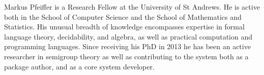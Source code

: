 \begin{participant}[type=R,PM=48,gender=male]{Markus Pfeiffer}
is a Research Fellow at the University of St Andrews. He is active both in the 
School of Computer Science and the School of Mathematics and Statistics. 
His unusual breadth of knowledge encompasses expertise in formal language 
theory, decidability, and algebra, as well as practical computation and
programming languages.
Since receiving his PhD in 2013 he has been an active researcher in semigroup 
theory as well as contributing to the \GAP system both as a package author, 
and as a core system developer.
\end{participant}
